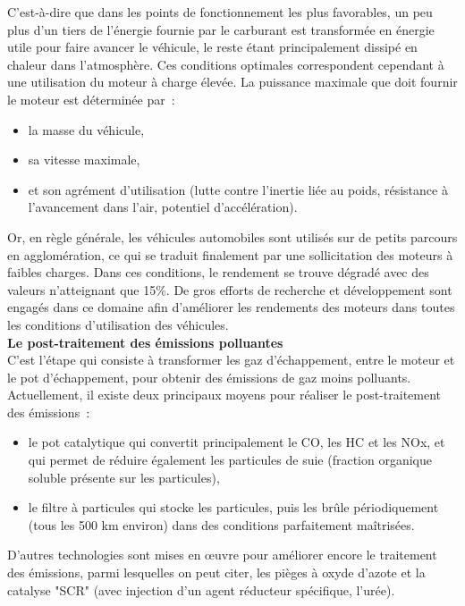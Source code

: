 \documentclass[8pt]{article}
\begin{document}
C’est-à-dire que dans les points de fonctionnement les plus favorables, un peu plus d'un tiers de l'énergie fournie par le carburant est transformée en énergie utile pour faire avancer le véhicule, le reste étant principalement dissipé en chaleur dans l'atmosphère. Ces conditions optimales correspondent cependant à une utilisation du moteur à charge élevée.
La puissance maximale que doit fournir le moteur est déterminée par~:
\begin{itemize}
	\setlength\itemsep{-0.1em}
	\item la masse du véhicule,
	\item sa vitesse maximale,
	\item et son agrément d'utilisation (lutte contre l’inertie liée au poids, résistance à l'avancement dans l'air, potentiel d'accélération).
\end{itemize}

Or, en règle générale, les véhicules automobiles sont utilisés sur de petits parcours en agglomération, ce qui se traduit finalement par une sollicitation des moteurs à faibles charges. Dans ces conditions, le rendement se trouve dégradé avec des valeurs n'atteignant que 15\%.
De gros efforts de recherche et développement sont engagés dans ce domaine afin d'améliorer les rendements des moteurs dans toutes les conditions d'utilisation des véhicules.\\

\textbf{Le post-traitement des émissions polluantes}\\

C’est l’étape qui consiste à transformer les gaz d'échappement, entre le moteur et le pot d’échappement, pour obtenir des émissions de gaz moins polluants.
Actuellement, il existe deux principaux moyens pour réaliser le post-traitement des émissions~:
\begin{itemize}
	\setlength\itemsep{-0.1em}
	\item le pot catalytique qui convertit principalement le CO, les HC et les NOx, et qui permet de réduire également les particules de suie (fraction organique soluble présente sur les particules),
	\item le filtre à particules qui stocke les particules, puis les brûle périodiquement (tous les 500 km environ) dans des conditions parfaitement maîtrisées.
\end{itemize}

D’autres technologies sont mises en œuvre pour améliorer encore le traitement des émissions, parmi lesquelles on peut citer, les pièges à oxyde d'azote et la catalyse "SCR" (avec injection d'un agent réducteur spécifique, l'urée).
\end{document}
